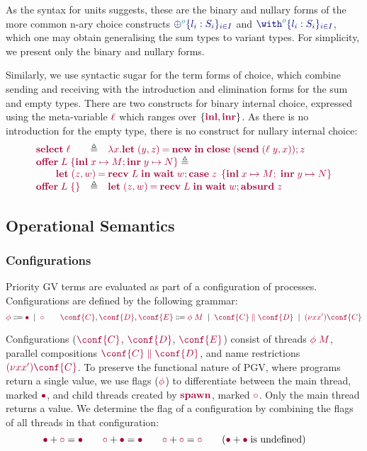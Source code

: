 As the syntax for units suggests, these are the binary and nullary forms of the more common n-ary choice constructs $\ty{{\oplus}^{\cs{o}}\{l_i:S_i\}_{i\in{I}}}$ and $\ty{{\with}^{\cs{o}}\{l_i:S_i\}_{i\in{I}}}$, which one may obtain generalising the sum types to variant types. For simplicity, we present only the binary and nullary forms.

Similarly, we use syntactic sugar for the term forms of choice, which combine sending and receiving with the introduction and elimination forms for the sum and empty types. There are two constructs for binary internal choice, expressed using the meta-variable $\tm{\ell}$ which ranges over $\{\tm{\labinl},\tm{\labinr}\}$. As there is no introduction for the empty type, there is no construct for nullary internal choice:
\[
  \begin{array}{lcl}
    \tm{\select{\ell}}
     & \elabarrow
     & \tm{\lambda x.\letpair{y}{z}{\new}{\andthen{\close\;(\send\;{\pair{\ell\;y}{x}})}{z}}}
    \\
    \multicolumn{3}{l}{%
      \tm{\offer{L}{x}{M}{y}{N}}\elabarrow}
    \\
    \multicolumn{3}{l}{%
    \qquad\tm{\letpair{z}{w}{\recv\;{L}}{\andthen{\wait\;{w}}{\casesum{z}{x}{M}{y}{N}}}}}
    \\
    \tm{\offeremp{L}}
     & \elabarrow
     & \tm{\letpair{z}{w}{\recv\;L}{\andthen{\wait\;{w}}{\absurd{z}}}}
  \end{array}
\]

\subsection{Operational Semantics}
\subsubsection*{Configurations}
Priority GV terms are evaluated as part of a configuration of processes. Configurations are defined by the following grammar:
\[
  \tm{\phi}
  \Coloneqq \tm{\main}
  \sep      \tm{\child}
  \hfill\qquad\hfill
  \tm{\conf{C}}, \tm{\conf{D}}, \tm{\conf{E}}
  \Coloneqq \tm{\phi\;M}
  \sep      \tm{\ppar{\conf{C}}{\conf{D}}}
  \sep      \tm{\res{x}{x'}{\conf{C}}}
\]

Configurations ($\tm{\conf{C}}$, $\tm{\conf{D}}$, $\tm{\conf{E}}$) consist of threads $\tm{\phi\;M}$, parallel compositions $\tm{\ppar{\conf{C}}{\conf{D}}}$, and name restrictions $\tm{\res{x}{x'}{\conf{C}}}$. To preserve the functional nature of PGV, where programs return a single value, we use flags ($\tm{\phi}$) to differentiate between the main thread, marked $\tm{\main}$, and child threads created by $\tm{\spawn}$, marked $\tm{\child}$. Only the main thread returns a value. We determine the flag of a configuration by combining the flags of all threads in that configuration:
\[
  \tm{\main}  + \tm{\child} = \tm{\main}
  \hfill\qquad\hfill
  \tm{\child} + \tm{\main}  = \tm{\main}
  \hfill\qquad\hfill
  \tm{\child} + \tm{\child} = \tm{\child}
  \hfill\qquad\hfill
  (\tm{\main}  + \tm{\main} \; \text{is undefined})
  \hfill\qquad\hfill
\]

